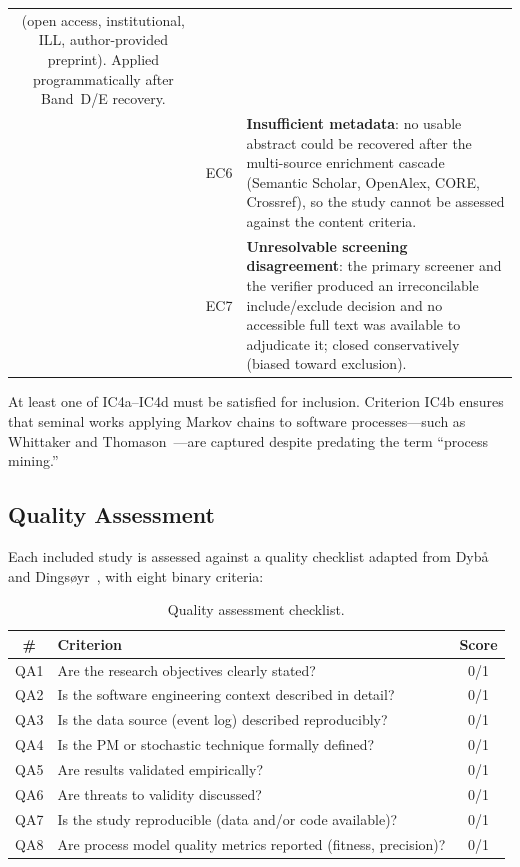 \begin{table}[H]
\begin{tabular}{c c p{10.2cm}}
          (open access, institutional, ILL, author-provided preprint).
          Applied programmatically after Band~D/E recovery. \\
& EC6  & \textbf{Insufficient metadata}: no usable abstract could be
          recovered after the multi-source enrichment cascade (Semantic
          Scholar, OpenAlex, CORE, Crossref), so the study cannot be assessed
          against the content criteria. \\
& EC7  & \textbf{Unresolvable screening disagreement}: the primary screener
          and the verifier produced an irreconcilable include/exclude
          decision and no accessible full text was available to adjudicate
          it; closed conservatively (biased toward exclusion). \\
\bottomrule
\end{tabular}
\end{table}
\FloatBarrier

At least one of IC4a--IC4d must be satisfied for inclusion. Criterion IC4b
ensures that seminal works applying Markov chains to software processes---such
as Whittaker and Thomason~\cite{whittaker1994}---are captured despite
predating the term ``process mining.''


\subsection{Quality Assessment}
\label{sec:slr-qa}

Each included study is assessed against a quality checklist adapted from
Dyb{\aa} and Dings{\o}yr~\cite{dyba2008}, with eight binary criteria:

\begin{table}[htbp]
\centering
\caption{Quality assessment checklist.}
\label{tab:qa}
\begin{tabular}{clc}
\toprule
\textbf{\#} & \textbf{Criterion} & \textbf{Score} \\
\midrule
QA1 & Are the research objectives clearly stated?                    & 0/1 \\
QA2 & Is the software engineering context described in detail?       & 0/1 \\
QA3 & Is the data source (event log) described reproducibly?         & 0/1 \\
QA4 & Is the PM or stochastic technique formally defined?            & 0/1 \\
QA5 & Are results validated empirically?                             & 0/1 \\
QA6 & Are threats to validity discussed?                             & 0/1 \\
QA7 & Is the study reproducible (data and/or code available)?        & 0/1 \\
QA8 & Are process model quality metrics reported (fitness, precision)?& 0/1 \\
\bottomrule
\end{tabular}
\end{table}


